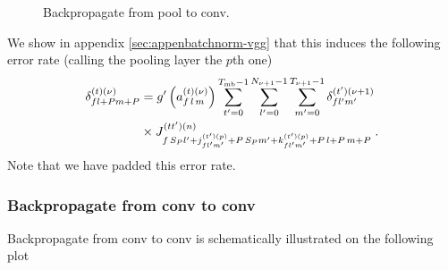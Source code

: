 \begin{figure}[H]
\begin{center}
\caption{Backpropagate from pool to conv.}
\end{center}
\end{figure}
We show in appendix \ref{sec:appenbatchnorm-vgg} that this induces the following error rate (calling the pooling layer the $p$th one)
\begin{align}
\delta^{(t)(\nu)}_{fl+Pm+P}&=g'\left(a_{f\,l\,m}^{(t)(\nu)}\right)
%
\sum_{t'=0}^{T_{{\rm mb}}-1}\sum^{N_{\nu+1}-1}_{l'=0}\sum^{T_{\nu+1}-1}_{m'=0}\delta_{fl'm'}^{(t')(\nu+1)}\notag\\
%
&\times J^{(tt')(n)}_{f\,S_P l'+j_{fl'm'}^{(t')(p)}+P\,S_Pm'+k_{fl'm'}^{(t')(p)}+P\,l+P\,m+P}\;.
\end{align}
Note that we have padded this error rate.

\subsubsection{Backpropagate from conv to conv}

Backpropagate from conv to conv is schematically illustrated on the following plot

